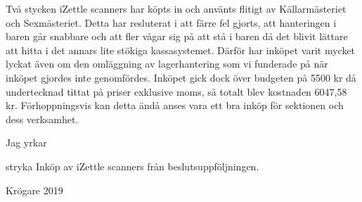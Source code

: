 \documentclass[../_main/handlingar.tex]{subfiles}
\begin{document}

    Två stycken iZettle scanners har köpts in och använts flitigt av Källarmästeriet och Sexmästeriet. Detta har resluterat i att färre fel gjorts, att hanteringen i baren går snabbare och att fler vågar sig på att stå i baren då det blivit lättare att hitta i det annars lite stökiga kassasystemet. Därför har inköpet varit mycket lyckat även om den omläggning av lagerhantering som vi funderade på när inköpet gjordes inte genomfördes. Inköpet gick dock över budgeten på 5500 kr då undertecknad tittat på priser exklusive moms, så totalt blev kostnaden 6047,58 kr. Förhoppningsvis kan detta ändå anses vara ett bra inköp för sektionen och dess verksamhet. 

    Jag yrkar 

\begin{attsatser}
    \att stryka Inköp av iZettle scanners från beslutsuppföljningen.
\end{attsatser}

\begin{signatures}{1}
    \signature{Davida Åström}{Krögare 2019}
\end{signatures}
\end{document}
